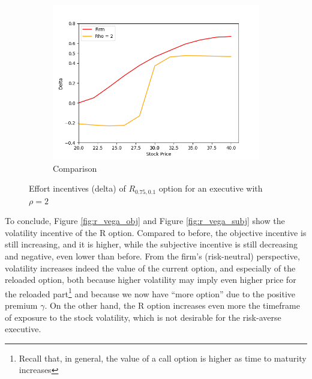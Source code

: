\begin{figure}[H]
\begin{subfigure}{0.32\textwidth}
        \centering
        \includegraphics[width=\textwidth]{fig/4/r_delta_comp.png}
        \caption{Comparison}
        \label{fig:r_delta_comp}
    \end{subfigure}
    \caption{Effort incentives (delta) of $R_{0.75, 0.1}$ option for an executive with $\rho = 2$}
    \label{fig:r_delta_both}
\end{figure}
\vspace*{15pt}

To conclude, Figure \ref*{fig:r_vega_obj} and Figure \ref*{fig:r_vega_subj} show the volatility incentive of the R option. Compared to before, the objective incentive is still increasing, and it is higher, while the subjective incentive is still decreasing and negative, even lower than before. From the firm's (risk-neutral) perspective, volatility increases indeed the value of the current option, and especially of the reloaded option, both because higher volatility may imply even higher price for the reloaded part\footnote{Recall that, in general, the value of a call option is higher as time to maturity increases} and because we now have ``more option'' due to the positive premium $\gamma$. On the other hand, the R option increases even more the timeframe of exposure to the stock volatility, which is not desirable for the risk-averse executive.

